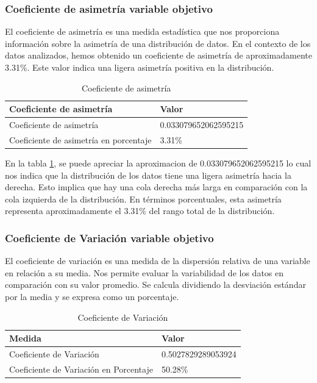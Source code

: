 \subsubsection{Coeficiente de asimetría variable objetivo}

El coeficiente de asimetría es una medida estadística que nos proporciona información sobre la asimetría de una distribución de datos. En el contexto de los datos analizados, hemos obtenido un coeficiente de asimetría de aproximadamente 3.31\%. Este valor indica una ligera asimetría positiva en la distribución.

\begin{table}[H]
    \centering
    \caption{Coeficiente de asimetría}
    \begin{tabular}{ll}
        \hline
        \textbf{Coeficiente de asimetría}      & \textbf{Valor}       \\
        \hline
        Coeficiente de asimetría               & 0.033079652062595215 \\
        Coeficiente de asimetría en porcentaje & 3.31\%               \\
        \hline
    \end{tabular}%
    \label{tab:skewness}%
\end{table}%

En la tabla \ref{tab:skewness}, se puede apreciar la aproximacion de 0.033079652062595215 lo cual nos indica que la distribución de los datos tiene una ligera asimetría hacia la derecha. Esto implica que hay una cola derecha más larga en comparación con la cola izquierda de la distribución. En términos porcentuales, esta asimetría representa aproximadamente el 3.31\% del rango total de la distribución.

\subsubsection{Coeficiente de Variación variable objetivo}

El coeficiente de variación es una medida de la dispersión relativa de una variable en relación a su media. Nos permite evaluar la variabilidad de los datos en comparación con su valor promedio. Se calcula dividiendo la desviación estándar por la media y se expresa como un porcentaje.

\begin{table}[H]
    \centering
    \caption{Coeficiente de Variación}
    \begin{tabular}{ll}
        \hline
        \textbf{Medida}                        & \textbf{Valor}     \\
        \hline
        Coeficiente de Variación               & 0.5027829289053924 \\
        \hline
        Coeficiente de Variación en Porcentaje & 50.28\%            \\
        \hline
    \end{tabular}%
    \label{tab:coef_variacion}%
\end{table}%

